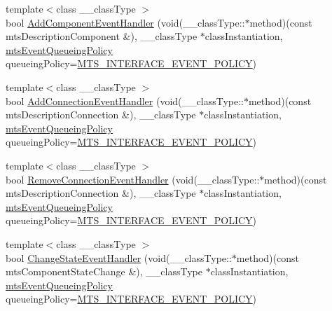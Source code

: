 \begin{DoxyCompactItemize}
\item 
{\footnotesize template$<$class \+\_\+\+\_\+class\+Type $>$ }\\bool \hyperlink{classmts_manager_component_services_aac555ce8c3bc4017ccbd8bb1d6aa40ad}{Add\+Component\+Event\+Handler} (void(\+\_\+\+\_\+class\+Type\+::$\ast$method)(const mts\+Description\+Component \&), \+\_\+\+\_\+class\+Type $\ast$class\+Instantiation, \hyperlink{mts_forward_declarations_8h_a9286ac2ca46e5bcd57059550faa96916}{mts\+Event\+Queueing\+Policy} queueing\+Policy=\hyperlink{mts_forward_declarations_8h_a9286ac2ca46e5bcd57059550faa96916a3d4338e85690d50e9ab167be77cdefa0}{M\+T\+S\+\_\+\+I\+N\+T\+E\+R\+F\+A\+C\+E\+\_\+\+E\+V\+E\+N\+T\+\_\+\+P\+O\+L\+I\+C\+Y})
\item 
{\footnotesize template$<$class \+\_\+\+\_\+class\+Type $>$ }\\bool \hyperlink{classmts_manager_component_services_a36c0cf4ae83f2f64ff73a48ad6f48216}{Add\+Connection\+Event\+Handler} (void(\+\_\+\+\_\+class\+Type\+::$\ast$method)(const mts\+Description\+Connection \&), \+\_\+\+\_\+class\+Type $\ast$class\+Instantiation, \hyperlink{mts_forward_declarations_8h_a9286ac2ca46e5bcd57059550faa96916}{mts\+Event\+Queueing\+Policy} queueing\+Policy=\hyperlink{mts_forward_declarations_8h_a9286ac2ca46e5bcd57059550faa96916a3d4338e85690d50e9ab167be77cdefa0}{M\+T\+S\+\_\+\+I\+N\+T\+E\+R\+F\+A\+C\+E\+\_\+\+E\+V\+E\+N\+T\+\_\+\+P\+O\+L\+I\+C\+Y})
\item 
{\footnotesize template$<$class \+\_\+\+\_\+class\+Type $>$ }\\bool \hyperlink{classmts_manager_component_services_a87f6e1aa2352935f3b913691e4eec55d}{Remove\+Connection\+Event\+Handler} (void(\+\_\+\+\_\+class\+Type\+::$\ast$method)(const mts\+Description\+Connection \&), \+\_\+\+\_\+class\+Type $\ast$class\+Instantiation, \hyperlink{mts_forward_declarations_8h_a9286ac2ca46e5bcd57059550faa96916}{mts\+Event\+Queueing\+Policy} queueing\+Policy=\hyperlink{mts_forward_declarations_8h_a9286ac2ca46e5bcd57059550faa96916a3d4338e85690d50e9ab167be77cdefa0}{M\+T\+S\+\_\+\+I\+N\+T\+E\+R\+F\+A\+C\+E\+\_\+\+E\+V\+E\+N\+T\+\_\+\+P\+O\+L\+I\+C\+Y})
\item 
{\footnotesize template$<$class \+\_\+\+\_\+class\+Type $>$ }\\bool \hyperlink{classmts_manager_component_services_a1f6ea6e32a98f6e314b52f9d9d594e06}{Change\+State\+Event\+Handler} (void(\+\_\+\+\_\+class\+Type\+::$\ast$method)(const mts\+Component\+State\+Change \&), \+\_\+\+\_\+class\+Type $\ast$class\+Instantiation, \hyperlink{mts_forward_declarations_8h_a9286ac2ca46e5bcd57059550faa96916}{mts\+Event\+Queueing\+Policy} queueing\+Policy=\hyperlink{mts_forward_declarations_8h_a9286ac2ca46e5bcd57059550faa96916a3d4338e85690d50e9ab167be77cdefa0}{M\+T\+S\+\_\+\+I\+N\+T\+E\+R\+F\+A\+C\+E\+\_\+\+E\+V\+E\+N\+T\+\_\+\+P\+O\+L\+I\+C\+Y})
\end{DoxyCompactItemize}

